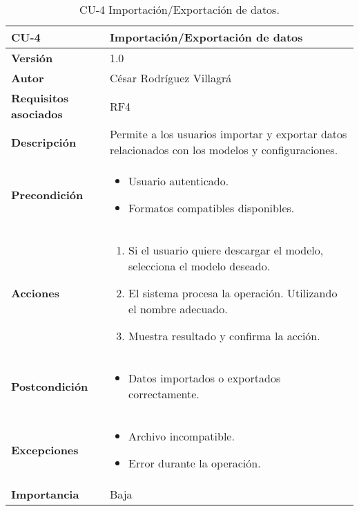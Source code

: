\begin{table}[p]
	\centering
	\begin{tabularx}{\linewidth}{ p{} p{} }
		\toprule
		\textbf{CU-4}    & \textbf{Importación/Exportación de datos} \\
		\toprule
		\textbf{Versión}              & 1.0    \\
		\textbf{Autor}                & César Rodríguez Villagrá \\
		\textbf{Requisitos asociados} & RF4 \\
		\textbf{Descripción}          & Permite a los usuarios importar y exportar datos relacionados con los modelos y configuraciones. \\
		\textbf{Precondición}         & 
		\begin{itemize}
			\item Usuario autenticado.
			\item Formatos compatibles disponibles.
		\end{itemize} \\
		\textbf{Acciones}             & 
		\begin{enumerate}
			\item Si el usuario quiere descargar el modelo, selecciona el modelo deseado.
			\item El sistema procesa la operación. Utilizando el nombre adecuado.
			\item Muestra resultado y confirma la acción.
		\end{enumerate} \\
		\textbf{Postcondición}        & 
		\begin{itemize}
			\item Datos importados o exportados correctamente.
		\end{itemize} \\
		\textbf{Excepciones}          & 
		\begin{itemize}
			\item Archivo incompatible.
			\item Error durante la operación.
		\end{itemize} \\
		\textbf{Importancia}          & Baja \\
		\bottomrule
	\end{tabularx}
	\caption{CU-4 Importación/Exportación de datos.}
\end{table}


